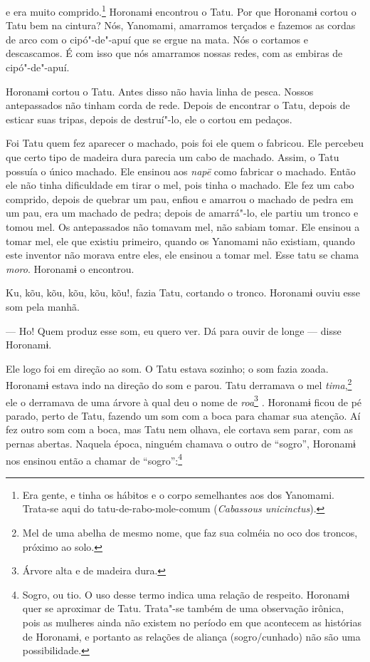 
 

 

 e era muito comprido.\footnote{  Era gente, e tinha os hábitos e o corpo semelhantes aos dos Yanomami. Trata-se aqui do tatu-de-rabo-mole-comum (\emph{Cabassous unicinctus}).}  Horonamɨ
encontrou o Tatu. 
Por que Horonamɨ cortou o Tatu bem na cintura? Nós, Yanomami, amarramos
terçados e fazemos as cordas de arco com o cipó"-de"-apuí que se ergue na
mata. Nós o cortamos e descascamos. É com isso que nós amarramos nossas
redes, com as embiras de cipó"-de"-apuí. 

Horonamɨ cortou o Tatu. Antes disso não havia linha de pesca. Nossos
antepassados não tinham corda de rede. Depois de encontrar o Tatu,
depois de esticar suas tripas, depois de destruí"-lo, ele o cortou em
pedaços. 

Foi Tatu quem fez aparecer o machado, pois foi ele quem o fabricou. Ele
percebeu que certo tipo de madeira dura parecia um cabo de machado.
Assim, o Tatu possuía o único machado. Ele ensinou aos \emph{napë} como
fabricar o machado. Então ele não tinha dificuldade em tirar o mel, pois
tinha o machado. Ele fez um cabo comprido, depois de quebrar um pau,
enfiou e amarrou o machado de pedra em um pau, era um machado de pedra;
depois de amarrá"-lo, ele partiu um tronco e tomou mel. Os antepassados
não tomavam mel, não sabiam tomar. Ele ensinou a tomar mel, ele que
existiu primeiro, quando os Yanomami não existiam, quando este inventor
não morava entre eles, ele ensinou a tomar mel. Esse tatu se
chama \emph{moro}. Horonamɨ o encontrou. 

Ku, kõu, kõu, kõu, kõu, kõu!, fazia Tatu, cortando o tronco.
Horonamɨ ouviu esse som pela manhã. 

--- Ho! Quem produz esse som, eu quero ver. Dá para ouvir de longe --- disse
Horonamɨ. 

Ele logo foi em direção ao som. O Tatu estava sozinho; o som fazia
zoada. Horonamɨ estava indo na direção do som e parou. Tatu derramava o
mel \emph{tima},\footnote{  Mel de uma abelha de mesmo nome, que faz sua colméia no oco dos troncos, próximo ao solo.} ele o derramava de uma árvore à qual deu o nome
de \emph{roa}\footnote{  Árvore alta e de madeira dura.} \emph{.} Horonamɨ ficou de pé parado, perto de Tatu, fazendo um som com a boca para chamar sua atenção. Aí fez
outro som com a boca, mas Tatu nem olhava, ele cortava sem parar, com as
pernas abertas. Naquela época, ninguém chamava o outro de ``sogro'',
Horonamɨ nos ensinou então a chamar de ``sogro'':\footnote{  Sogro, ou tio. O uso desse termo indica uma relação de respeito. Horonamɨ quer se aproximar de Tatu. Trata"-se também de uma observação irônica, pois as mulheres ainda não existem no período em que acontecem as histórias de Horonamɨ, e portanto as relações de aliança (sogro/cunhado) não são uma possibilidade.}

